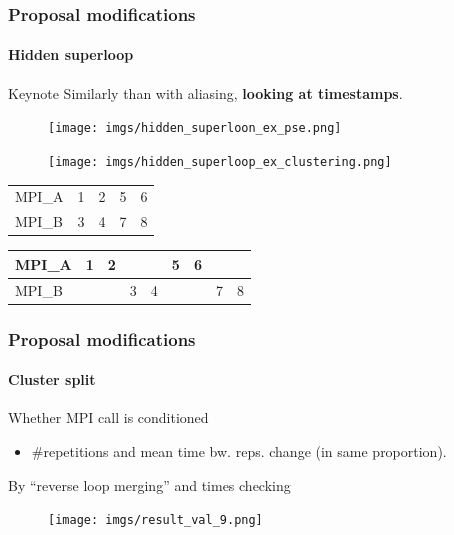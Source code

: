 \documentclass{beamer}
\begin{document}
\begin{frame}
	\frametitle{Proposal modifications}
	\framesubtitle{Hidden superloop}
	\begin{block}{Keynote}
		Similarly than with aliasing, \textbf{looking at timestamps}.
	\end{block}
	\begin{multicols}{2}
		\begin{figure}
			\texttt{[image: imgs/hidden\_superloon\_ex\_pse.png]}
		\end{figure}
		\columnbreak
		\begin{figure}
			\texttt{[image: imgs/hidden\_superloop\_ex\_clustering.png]}
		\end{figure}
	\end{multicols}
	\pause
	\begin{multicols}{2}
		\begin{table}[]
			\begin{tabular}{l | llll}
				MPI\_A & 1 & 2 & 5 & 6 \\ 
				MPI\_B & 3 & 4 & 7 & 8
			\end{tabular}
		\end{table}
		\pause
		\columnbreak
		\begin{table}[]
		\begin{tabular}{l | llllllll}
			MPI\_A & 1 & 2 &   &   & 5 & 6 &   &   \\ \hline
			MPI\_B &   &   & 3 & 4 &   &   & 7 & 8
		\end{tabular}
		\end{table}
	\end{multicols}
\end{frame}

\begin{frame}
\frametitle{Proposal modifications}
\framesubtitle{Cluster split}

\pause
Whether MPI call is conditioned
\begin{itemize}
	\item \#repetitions and mean time bw. reps. change (in same proportion).
\end{itemize} 
\pause
By ``reverse loop merging'' and times checking
\begin{figure}
	\texttt{[image: imgs/result\_val\_9.png]}
\end{figure}
\end{frame}
\end{document}
